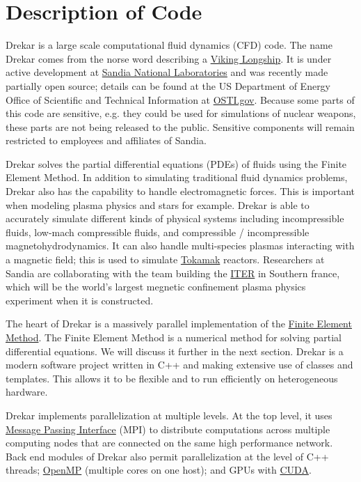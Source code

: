 \documentclass[11pt]{article} %
\begin{document}
\section{Description of Code}
Drekar is a large scale computational fluid dynamics (CFD) code.
The name Drekar comes from the norse word describing a 
\href{https://en.wikipedia.org/wiki/Longship}{Viking Longship}.
It is under active development at \href{https://www.sandia.gov/}{Sandia National Laboratories}
and was recently made partially open source; details can be found at the US Department of Energy
Office of Scientific and Technical Information at \href{https://www.osti.gov/biblio/1364765}{OSTI.gov}.
Because some parts of this code are sensitive, e.g. they could be used for simulations of nuclear weapons,
these parts are not being released to the public.
Sensitive components will remain restricted to employees and affiliates of Sandia.


Drekar solves the partial differential equations (PDEs) of fluids using the Finite Element Method.
In addition to simulating traditional fluid dynamics problems, Drekar also has the capability to handle
electromagnetic forces.  This is important when modeling plasma physics and stars for example.
Drekar is able to accurately simulate different kinds of physical systems including incompressible fluids,
low-mach compressible fluids, and compressible / incompressible magnetohydrodynamics.
It can also handle multi-species plasmas interacting with a magnetic field;
this is used to simulate \href{https://en.wikipedia.org/wiki/Tokamak}{Tokamak} reactors.
Researchers at Sandia are collaborating with the team building the \href{https://en.wikipedia.org/wiki/ITER}{ITER}
in Southern france, which will be the world's largest megnetic confinement plasma physics experiment when
it is constructed.

The heart of Drekar is a massively parallel implementation of the 
\href{https://en.wikipedia.org/wiki/Finite_element_method}{Finite Element Method}.
The Finite Element Method is a numerical method for solving partial differential equations.
We will discuss it further in the next section.
Drekar is a modern software project written in C++ and making extensive use of classes and templates.  
This allows it to be flexible and to run efficiently on heterogeneous hardware.

Drekar implements parallelization at multiple levels.
At the top level, it uses 
\href{https://en.wikipedia.org/wiki/Message_Passing_Interface}{Message Passing Interface} (MPI)
to distribute computations across multiple computing nodes that are connected on
the same high performance network.
Back end modules of Drekar also permit parallelization at the level of C++ threads;
\href{https://en.wikipedia.org/wiki/OpenMP}{OpenMP} (multiple cores on one host); 
and GPUs with \href{https://en.wikipedia.org/wiki/CUDA}{CUDA}.
\end{document}
